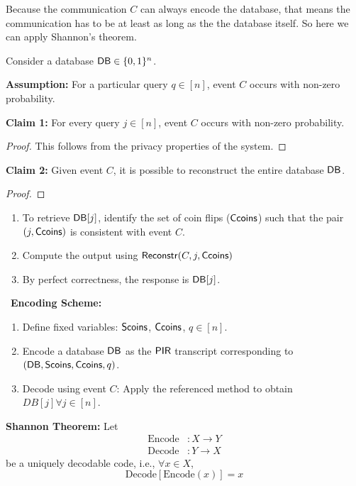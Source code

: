 {Because the communication $C$ can always encode the database, that means the communication has to be at least as long as the the database itself. So here we can apply Shannon's theorem.

Consider a database ${\sf DB} \in \{0,1\}^n$.

\textbf{Assumption:} For a particular query $q \in [n]$, event $C$ occurs with non-zero probability.

\textbf{Claim 1:} For every query $j \in [n]$, event $C$ occurs with non-zero probability.

\begin{proof}
This follows from the privacy properties of the system.
\end{proof}

\textbf{Claim 2:} Given event $C$, it is possible to reconstruct the entire database ${\sf DB}$.

\begin{proof}

\end{proof}

\begin{enumerate}
    \item To retrieve ${\sf DB}[j]$, identify the set of coin flips (${\sf Ccoins}$) such that the pair $({j}, {\sf Ccoins})$ is consistent with event $C$.
    \item Compute the output using ${\sf Reconstr}(C, j, {\sf Ccoins})$
    \item By perfect correctness, the response is ${\sf DB}[j]$.
\end{enumerate}
\
\textbf{Encoding Scheme:}

\begin{enumerate}
    \item Define fixed variables: ${\sf Scoins}$, ${\sf Ccoins}$,  $q \in [n]$.
    \item Encode a database ${\sf DB}$ as the ${\sf PIR}$ transcript corresponding to  $({\sf DB}, {\sf Scoins}, {\sf Ccoins}, q)$.
    \item Decode using event $C$: Apply the referenced method to obtain $DB[{j}] \forall j \in [n]$.
\end{enumerate}

\textbf{Shannon Theorem:} Let
\begin{align*}
\text{Encode} &: X \rightarrow Y \\
\text{Decode} &: Y \rightarrow X
\end{align*}
be a uniquely decodable code, i.e., \(\forall x \in X\),
\begin{equation*}
\text{Decode}[\text{Encode}(x)] = x
\end{equation*}

}
